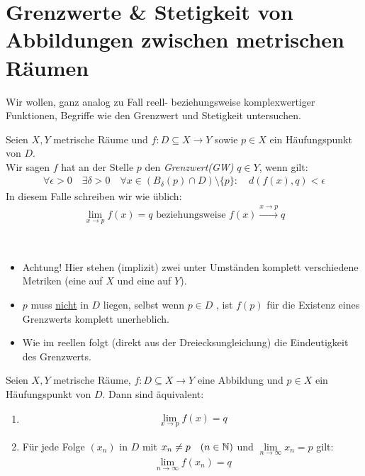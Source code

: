 \section{Grenzwerte \& Stetigkeit von Abbildungen zwischen metrischen Räumen}

Wir wollen, ganz analog zu Fall reell- beziehungsweise komplexwertiger Funktionen, 
Begriffe wie den Grenzwert und Stetigkeit untersuchen.

\begin{Definition}{%
	Seien $X,Y$ metrische Räume und $f: D \subseteq X \rightarrow Y$ sowie $p \in 
	X$ ein Häufungspunkt von $D$.\\
	Wir sagen $f$ hat an der Stelle $p$ den \emph{Grenzwert(GW)} $q \in Y$, wenn 
	gilt:
	\begin{align*}
		\forall \epsilon > 0 \quad \exists \delta > 0  \quad \forall x 
		\in (B_\delta(p) \cap D) \setminus \{p\}: \quad d(f(x), q) < \epsilon
	\end{align*}
	In diesem Falle schreiben wir wie üblich:
	\begin{align*}
		\lim\limits_{x \rightarrow p}{f(x)} = q \text{ beziehungsweise } 
		f(x) \xrightarrow{x \rightarrow p}q
	\end{align*}
}\end{Definition}

\begin{Bemerkung}{
	~\begin{itemize}
		\item Achtung! Hier stehen (implizit) zwei unter Umständen komplett 
		verschiedene Metriken (eine auf $X$ und eine auf $Y$).
		\item $p$ muss \underline{nicht} in $D$ liegen, selbst wenn $p \in D$ , ist 
		$f(p)$ für die Existenz eines Grenzwerts komplett unerheblich.
		\item Wie im reellen folgt (direkt aus der Dreiecksungleichung) die 
		Eindeutigkeit des Grenzwerts.
	\end{itemize}
}\end{Bemerkung}

\begin{Satz}{%
	Seien $X,Y$ metrische Räume, $f: D \subseteq X \rightarrow Y$ eine Abbildung 
	und $p \in X$ ein Häufungspunkt von $D$. Dann sind äquivalent:
	\begin{enumerate}
		\item \label{vl_24_stp_1} \begin{align*}
				\lim\limits_{x \rightarrow p}{f(x)} = q
			\end{align*}
		\item \label{vl_24_stp_2} Für jede Folge $(x_n)$ in $D$ mit $x_n \neq p 
		\quad (n \in \mathbb{N})$ und $\lim\limits_{n \rightarrow \infty}{x_n}=p$ gilt:
			\begin{align*}
				\lim\limits_{n \rightarrow \infty}{f(x_n)} = q
			\end{align*}
	\end{enumerate}
}\end{Satz}


